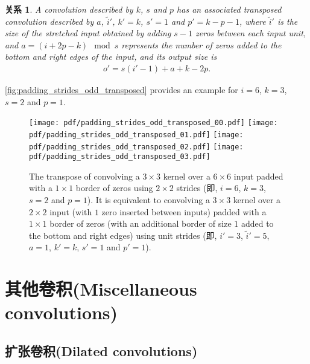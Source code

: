 \documentclass[notitlepage]{ctexrep}
\newtheorem{relationship}{关系}
\begin{document}
\begin{relationship}\label{rel:padding_strides_transposed_odd}
A convolution described by $k$, $s$ and $p$ has an
associated transposed convolution described by $a$, $\tilde{i}'$, $k' = k$, $s'
= 1$ and $p' = k - p - 1$, where $\tilde{i}'$ is the size of the stretched
input obtained by adding $s - 1$ zeros between each input unit, and $a = (i +
2p - k) \mod s$ represents the number of zeros added to the bottom and right edges
of the input, and its output size is
\begin{equation*}
\begin{split}
    o' = s (i' - 1) + a + k - 2p.
\end{split}
\end{equation*}
\end{relationship}

\autoref{fig:padding_strides_odd_transposed} provides an example for $i = 6$, $k
= 3$, $s = 2$ and $p = 1$.

\begin{figure}[p]
    \centering
    \texttt{[image: pdf/padding\_strides\_odd\_transposed\_00.pdf]}
    \texttt{[image: pdf/padding\_strides\_odd\_transposed\_01.pdf]}
    \texttt{[image: pdf/padding\_strides\_odd\_transposed\_02.pdf]}
    \texttt{[image: pdf/padding\_strides\_odd\_transposed\_03.pdf]}
    \caption{\label{fig:padding_strides_odd_transposed} The transpose of
        convolving a $3 \times 3$ kernel over a $6 \times 6$ input padded with a
        $1 \times 1$ border of zeros using $2 \times 2$ strides (即, $i = 6$,
        $k = 3$, $s = 2$ and $p = 1$). It is equivalent to convolving a $3
        \times 3$ kernel over a $2 \times 2$ input (with $1$ zero inserted
        between inputs) padded with a $1 \times 1$ border of zeros (with an
        additional border of size $1$ added to the bottom and right edges) using
        unit strides (即, $i' = 3$, $\tilde{i}' = 5$, $a = 1$, $k' = k$, $s' =
        1$ and $p' = 1$).}
\end{figure}

\chapter{其他卷积(Miscellaneous convolutions)}

\section{扩张卷积(Dilated convolutions)}
\end{document}
